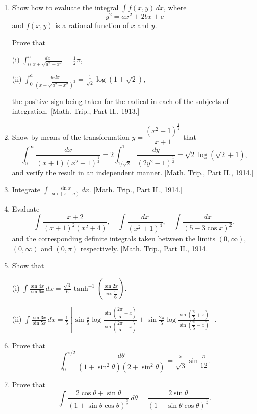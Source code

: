 \documentclass[11pt, a4paper]{article}
\newcommand{\source}[1]{\hfill\textnormal{[#1]}}
\begin{document}
\begin{enumerate}[leftmargin=2em]
\item Show how to evaluate the integral $\displaystyle\int f(x,y)\,dx$, where
\[
y^2=ax^2+2bx+c
\]
and $f(x,y)$ is a rational function of $x$ and $y$.

Prove that

(i) $\displaystyle\int_0^a\frac{dx}{x+\sqrt{a^2-x^2}}=\frac12\pi$,

(ii) $\displaystyle\int_0^a\frac{a\,dx}{(x+\sqrt{a^2-x^2})^2}=\frac{1}{\sqrt2}\log(1+\sqrt2)$,

the positive sign being taken for the radical in each of the subjects of integration. \source{Math. Trip., Part II., 1913.}

\item Show by means of the transformation $y=\dfrac{(x^2+1)^{\frac12}}{x+1}$ that
\[
\int_0^\infty\frac{dx}{(x+1)(x^2+1)^{\frac12}}=2\int_{1/\sqrt2}^1\frac{dy}{(2y^2-1)^{\frac12}}=\sqrt2\log(\sqrt2+1),
\]
and verify the result in an independent manner. \source{Math. Trip., Part II., 1914.}

\item Integrate $\displaystyle\int\frac{\sin x}{\sin(x-a)}\,dx$. \source{Math. Trip., Part II., 1914.}

\item Evaluate
\[
\int\frac{x+2}{(x+1)^2(x^2+4)},\quad\int\frac{dx}{(x^2+1)^4},\quad\int\frac{dx}{(5-3\cos x)^2},
\]
and the corresponding definite integrals taken between the limits $(0,\infty)$, $(0,\infty)$ and $(0,\pi)$ respectively. \source{Math. Trip., Part II., 1914.}

\item Show that

(i) $\displaystyle\int\frac{\sin4x}{\sin6x}\,dx=\frac{\sqrt3}{6}\tanh^{-1}\left(\frac{\sin2x}{\cos\dfrac{\pi}{6}}\right)$.

(ii) $\displaystyle\int\frac{\sin3x}{\sin5x}\,dx=\frac15\left[\sin\frac{\pi}{5}\log\frac{\sin\left(\dfrac{2\pi}{5}+x\right)}{\sin\left(\dfrac{2\pi}{5}-x\right)}+\sin\frac{2\pi}{5}\log\frac{\sin\left(\dfrac{\pi}{5}+x\right)}{\sin\left(\dfrac{\pi}{5}-x\right)}\right]$.

\item Prove that
\[
\int_0^{\pi/2}\frac{d\theta}{(1+\sin^2\theta)(2+\sin^2\theta)}=\frac{\pi}{\sqrt3}\sin\frac{\pi}{12}.
\]

\item Prove that
\[
\int\frac{2\cos\theta+\sin\theta}{(1+\sin\theta\cos\theta)^{\frac32}}\,d\theta=\frac{2\sin\theta}{(1+\sin\theta\cos\theta)^{\frac12}}.
\]

\end{enumerate}
\end{document}
